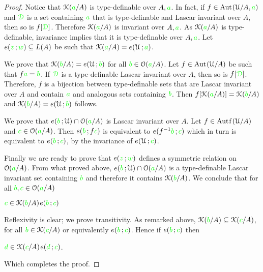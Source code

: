 \begin{proof}
  Notice that $\EuScript K({\color{green} a}/A)$ is type-definable over $A,{\color{green} a}$.
  In fact, if $f\in{\rm Aut\kern.15ex}(\EuScript U/A,{\color{green} a})$ and ${\color{green}\EuScript D}$ is a set containing ${\color{green} a}$ that is type-definable and Lascar invariant over $A$, then so is $f[{\color{green}\EuScript D}]$.
  Therefore $\EuScript K({\color{green} a}/A)$ is invariant over $A,{\color{green} a}$.
  As $\EuScript K({\color{green} a}/A)$ is type-definable, invariance implies that it is type-definable over $A,{\color{green} a}$.
  Let $e({\color{green} z}\,;{\color{green} w})\subseteq L(A)$ be such that $\EuScript K({\color{green} a}/A)=e(\EuScript U\,;{\color{green} a})$. 
    
  We prove that $\EuScript K({\color{green} b}/A)=e(\EuScript U\,;{\color{green} b})$ for all ${\color{green} b}\in\EuScript O({\color{green} a}/A)$.
  Let $f\in{\rm Aut\kern.15ex}(\EuScript U/A)$ be such that $f{\color{green} a}={\color{green} b}$.
  If ${\color{green}\EuScript D}$ is a type-definable Lascar invariant over $A$, then so is $f[{\color{green}\EuScript D}]$.
  Therefore, $f$ is a bijection between type-definable sets that are Lascar invariant over $A$ and contain ${\color{green} a}$ and analogous sets containing ${\color{green} b}$.
  Then $f[\EuScript K({\color{green} a}/A)]=\EuScript K({\color{green} b}/A)$ and $\EuScript K({\color{green} b}/A)=e(\EuScript U\,;{\color{green} b})$ follows.
    
  We prove that $e({\color{green} b}\,;\EuScript U)\cap \EuScript O({\color{green} a}/A)$ is Lascar invariant over $A$.
  Let $f\in\mathord{\rm Aut\kern.15ex{f}\kern.15ex}(\EuScript U/A)$ and ${\color{green} c}\in\EuScript O({\color{green} a}/A)$.
  Then $e({\color{green} b}\,;f{\color{green} c})$ is equivalent to  $e(f^{-1}{\color{green} b}\,;{\color{green} c})$ which in turn is equivalent to $e({\color{green} b}\,;{\color{green} c})$, by the invariance of $e(\EuScript U\,;{\color{green} c})$. 
    
  Finally we are ready to prove that $e({\color{green} z}\,;{\color{green} w})$ defines a symmetric relation on $\EuScript O({\color{green} a}/A)$.
  From what proved above, $e({\color{green} b}\,;\EuScript U)\cap \EuScript O({\color{green} a}/A)$ is a type-definable Lascar invariant set containing ${\color{green} b}$ and therefore it contains $\EuScript K({\color{green} b}/A)$.
  We conclude that for all ${\color{green} b},{\color{green} c}\in\EuScript O({\color{green} a}/A)$
    
  \medrel{\iff}${\color{green} c}\in\EuScript K({\color{green} b}/A)$\medrel{\imp}$e({\color{green} b}\,;{\color{green} c})$
    
  Reflexivity is clear; we prove transitivity.
  As remarked above, $\EuScript K({\color{green} b}/A)\subseteq\EuScript K({\color{green} c}/A)$, for all ${\color{green} b}\in\EuScript K({\color{green} c}/A)$ or equivalently $e({\color{green} b}\,;{\color{green} c})$.
  Hence if $e({\color{green} b}\,;{\color{green} c})$ then
  
  \medrel{\iff}${\color{green} d}\in\EuScript K({\color{green} c}/A)$\medrel{\imp}$e({\color{green} d}\,;{\color{green} c})$.
    
  Which completes the proof.
\end{proof}

